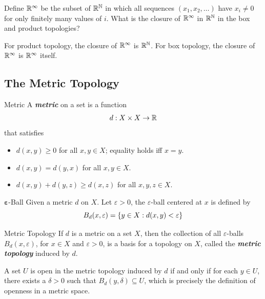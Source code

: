 \documentclass[12pt,a4paper]{article}
\begin{document}
    \begin{ex}\label{2.8.11}
        Define $\mathbb{R}^\infty$ be the subset of $\mathbb{R}^{\mathbb{N}}$ in which all sequences $(x_1,x_2,\dots)$ have $x_i\neq0$ for only finitely many values of $i$. What is the closure of $\mathbb{R}^\infty$ in $\mathbb{R}^{\mathbb{N}}$ in the box and product topologies?
    \end{ex}
    \begin{sol}
        For product topology, the closure of $\mathbb{R}^\infty$ is $\mathbb{R}^{\mathbb{N}}$. For box topology, the closure of $\mathbb{R}^\infty$ is $\mathbb{R}^\infty$ itself.
    \end{sol}
    \hfill

    \subsection{The Metric Topology}
    \begin{defi}{Metric}
        A \textbf{\textit{metric}} on a set is a function
        $$
        d:X\times X\to\mathbb{R}
        $$
        that satisfies
        \begin{itemize}
            \item $d(x,y)\geq0$ for all $x,y\in X$; equality holds iff $x=y$.
            \item $d(x,y)=d(y,x)$ for all $x,y\in X$.
            \item $d(x,y)+d(y,z)\geq d(x,z)$ for all $x,y,z\in X$.
        \end{itemize}
    \end{defi}
    \hfill

    \begin{defi}{$\mathbf{\varepsilon}$-Ball}
        Given a metric $d$ on $X$. Let $\varepsilon>0$, the $\varepsilon$-ball centered at $x$ is defined by
        $$
        B_d(x,\varepsilon)=\left\{y\in X:d(x,y)<\varepsilon\right\}
        $$
    \end{defi}
    \hfill

    \begin{defi}{Metric Topology}
        If $d$ is a metric on a set $X$, then the collection of all $\varepsilon$-balls $B_d(x,\varepsilon)$, for $x\in X$ and $\varepsilon>0$, is a basis for a topology on $X$, called the \textbf{\textit{metric topology}} induced by $d$.
    \end{defi}
    \begin{remark}
        A set $U$ is open in the metric topology induced by $d$ if and only if for each $y\in U$, there exists a $\delta>0$ such that $B_d(y,\delta)\subseteq U$, which is precisely the definition of openness in a metric space.
    \end{remark}
    \hfill
    
\end{document}
